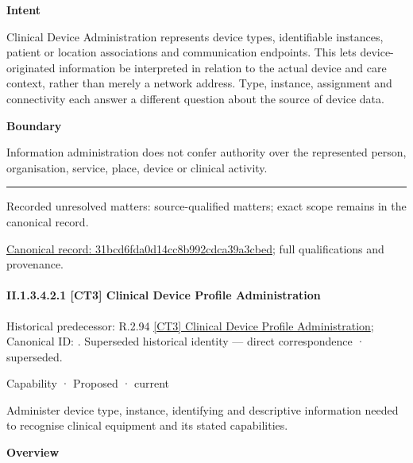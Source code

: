 \textbf{Intent}



Clinical Device Administration represents device types, identifiable instances, patient or location associations and communication endpoints. This lets device-originated information be interpreted in relation to the actual device and care context, rather than merely a network address. Type, instance, assignment and connectivity each answer a different question about the source of device data.



\textbf{Boundary}



Information administration does not confer authority over the represented person, organisation, service, place, device or clinical activity.



\medskip\hrule\medskip

{\small Recorded unresolved matters: source-qualified matters; exact scope remains in the canonical record.}\par
{\footnotesize \href{../../../../../../../continuum/strategy/capability/31bcd6fda0d14cc8b992cdca39a3cbed.md}{Canonical record: 31bcd6fda0d14cc8b992cdca39a3cbed}; full qualifications and provenance.}\par
\paragraph*{II.1.3.4.2.1 [CT3] Clinical Device Profile Administration}
\label{navigation:II.1.3.4.2.1}

{\small Historical predecessor: R.2.94 \hyperref[element:e8c72952da144d6883caba7fd2afb88d]{[CT3] Clinical Device Profile Administration}; Canonical ID: \texttt{}. Superseded historical identity — direct correspondence · superseded.}\par
\label{element:d0a1ba80c790476ea6042290eb7ea09e}
{\small Capability · Proposed · current}\par

Administer device type, instance, identifying and descriptive information needed to recognise clinical equipment and its stated capabilities.



\textbf{Overview}



